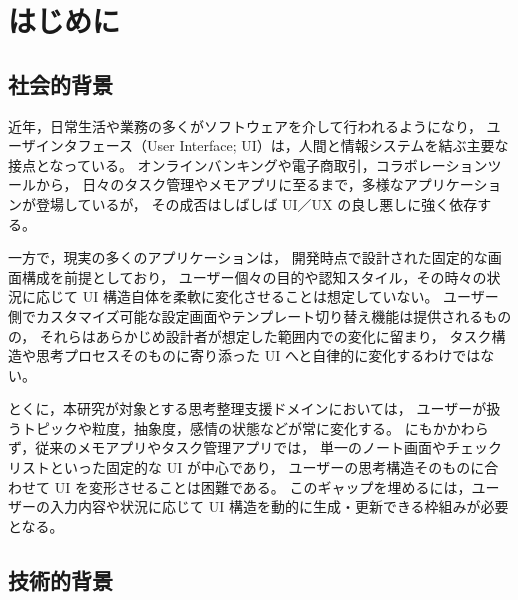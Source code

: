 \documentclass[senior,final,11pt,dvipdfmx]{iputit-thesis}
\begin{document}
\maketitle


\frontmatter %
\tableofcontents %
\listoffigures %
\listoftables %

\mainmatter %

\chapter{はじめに}
\label{chap:introduction}

\section{社会的背景}

近年，日常生活や業務の多くがソフトウェアを介して行われるようになり，
ユーザインタフェース（User Interface; UI）は，人間と情報システムを結ぶ主要な接点となっている。
オンラインバンキングや電子商取引，コラボレーションツールから，
日々のタスク管理やメモアプリに至るまで，多様なアプリケーションが登場しているが，
その成否はしばしば UI／UX の良し悪しに強く依存する\cite{nielsen2012usability}。

一方で，現実の多くのアプリケーションは，
開発時点で設計された固定的な画面構成を前提としており，
ユーザー個々の目的や認知スタイル，その時々の状況に応じて
UI 構造自体を柔軟に変化させることは想定していない。
ユーザー側でカスタマイズ可能な設定画面やテンプレート切り替え機能は提供されるものの，
それらはあらかじめ設計者が想定した範囲内での変化に留まり，
タスク構造や思考プロセスそのものに寄り添った UI へと自律的に変化するわけではない。

とくに，本研究が対象とする思考整理支援ドメインにおいては，
ユーザーが扱うトピックや粒度，抽象度，感情の状態などが常に変化する。
にもかかわらず，従来のメモアプリやタスク管理アプリでは，
単一のノート画面やチェックリストといった固定的な UI が中心であり，
ユーザーの思考構造そのものに合わせて UI を変形させることは困難である。
このギャップを埋めるには，ユーザーの入力内容や状況に応じて UI 構造を動的に生成・更新できる枠組みが必要となる。

\section{技術的背景}
\end{document}
